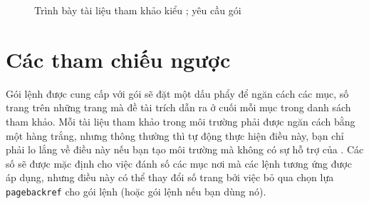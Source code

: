 \documentclass[a4paper]{report}
\begin{document}
\begin{figure}[htbp]
\begin{center}
\end{center}
\caption{Trình bày tài liệu tham khảo kiểu ; yêu cầu gói }
\label{fig:bibapalike}
\end{figure}

\section{Các tham chiếu ngược}

Gói lệnh  được cung cấp với gói  sẽ đặt một dấu phẩy để ngăn cách các mục, số trang trên những trang mà đề tài trích dẫn ra ở cuối mỗi mục trong danh sách tham khảo.
Mỗi tài liệu tham khảo trong môi trường  phải được ngăn cách bằng một hàng trắng, nhưng thông thường thì \BiBTeX{} tự động thực hiện điều này, bạn chỉ phải lo lắng về điều này nếu bạn tạo môi trường  mà không có sự hỗ trợ của \BiBTeX{}.
Các số sẽ được mặc định cho việc đánh số các mục nơi mà các lệnh  tương ứng được áp dụng, nhưng điều này có thể thay đổi số trang bởi việc bỏ qua chọn lựa \texttt{pagebackref} cho gói lệnh  (hoặc gói lệnh  nếu bạn dùng nó).
\end{document}
